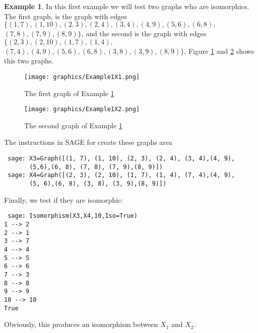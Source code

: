 \documentclass[12pt,a4paper]{book}
\theoremstyle{plain}
\theoremstyle{definition}
\newtheorem{example}{Example}
\theoremstyle{remark}
\begin{document}
 \begin{example}\label{ImpTestEx1}
  In this first example we will test two graphs who are isomorphics. The first graph, is the graph with edges $ \{ (1, 7), (1, 10), 
  (2, 3), (2, 4), (3, 4), (4, 9), (5, 6), (6, 8),$ $ (7, 8), (7, 9),(8, 9) \} $, and the second is the graph with edges $\{ (2, 3), 
  (2, 10), (1, 7), (1, 4),$ $ (7, 4), (4, 9), (5, 6), (6, 8),  (3, 8), (3, 9),(8, 9) \} $, Figure \ref{Example1X1} and \ref{Example1X2} shows this two graphs.

  \begin{figure}
\centering
 \texttt{[image: graphics/Example1X1.png]}
 \caption{The first graph of Example \ref{ImpTestEx1}}\label{Example1X1}
\end{figure}

\begin{figure}
\centering
\texttt{[image: graphics/Example1X2.png]}
 \caption{The second graph of Example \ref{ImpTestEx1}}\label{Example1X2}
\end{figure}

The instructions in SAGE for create these graphs area

\begin{verbatim}
 sage: X3=Graph([(1, 7), (1, 10), (2, 3), (2, 4), (3, 4),(4, 9), 
       (5,6),(6, 8), (7, 8), (7, 9),(8, 9)])
 sage: X4=Graph([(2, 3), (2, 10), (1, 7), (1, 4), (7, 4),(4, 9), 
       (5, 6),(6, 8), (3, 8), (3, 9),(8, 9)])
\end{verbatim}

Finally, we test if they are isomorphic: 

\begin{verbatim}
 sage: Isomorphism(X3,X4,10,Iso=True)
1 --> 2
2 --> 1
3 --> 7
4 --> 4
5 --> 5
6 --> 6
7 --> 3
8 --> 8
9 --> 9
10 --> 10
True
\end{verbatim}

Obviously, this produces  an isomorphism between $X_1$ and $X_2$.
\end{example}
\end{document}
